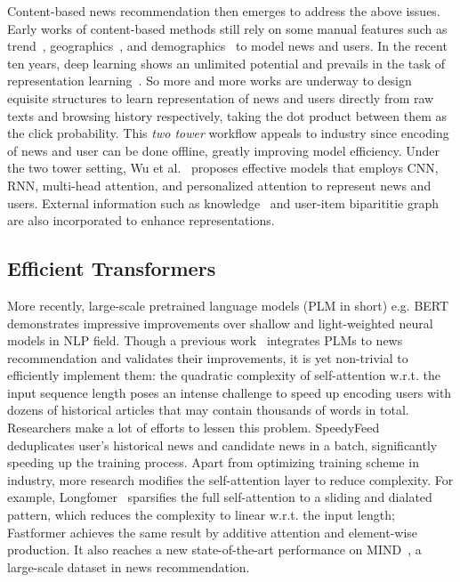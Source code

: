 \documentclass[sigconf,anonymous]{acmart}
\begin{document}
Content-based news recommendation then emerges to address the above issues. Early works of content-based methods still rely on some manual features such as trend~\cite{liu_bayesian_news_trend}, geographics~\cite{li_contextual_bandit}, and demographics~\cite{cheng_Wide&Deep} to model news and users. In the recent ten years, deep learning shows an unlimited potential and prevails in the task of representation learning~\cite{Bengio_representation_learning}. So more and more works are underway to design equisite structures to learn representation of news and users directly from raw texts and browsing history respectively, taking the dot product between them as the click probability. This \emph{two tower} workflow appeals to industry since encoding of news and user can be done offline, greatly improving model efficiency. Under the two tower setting, Wu et al.~\cite{wu_GNN,wu_heterogeneous,wu_LSTUR,wu_NAML,wu_NPA,wu_NRMS,wu_topic-aware} proposes effective models that employs CNN, RNN, multi-head attention, and personalized attention to represent news and users. External information such as knowledge~\cite{wang_DKN} and user-item biparititie graph~\cite{wu_GNN,hu_GNN_disentanglement} are also incorporated to enhance representations.

\subsection{Efficient Transformers}
More recently, large-scale pretrained language models (PLM in short) e.g. BERT~\cite{Bert} demonstrates impressive improvements over shallow and light-weighted neural models in NLP field. Though a previous work~\cite{wu_newsPLM} integrates PLMs to news recommendation and validates their improvements, it is yet non-trivial to efficiently implement them: the quadratic complexity of self-attention w.r.t. the input sequence length poses an intense challenge to speed up encoding users with dozens of historical articles that may contain thousands of words in total. Researchers make a lot of efforts to lessen this problem. SpeedyFeed~\cite{xiao_speedy} deduplicates user's historical news and candidate news in a batch, significantly speeding up the training process. Apart from optimizing training scheme in industry, more research modifies the self-attention layer to reduce complexity. For example, Longfomer~\cite{Longformer} sparsifies the full self-attention to a sliding and dialated pattern, which reduces the complexity to linear w.r.t. the input length; Fastformer achieves the same result by additive attention and element-wise production. It also reaches a new state-of-the-art performance on MIND~\cite{wu_MIND}, a large-scale dataset in news recommendation.
\end{document}
